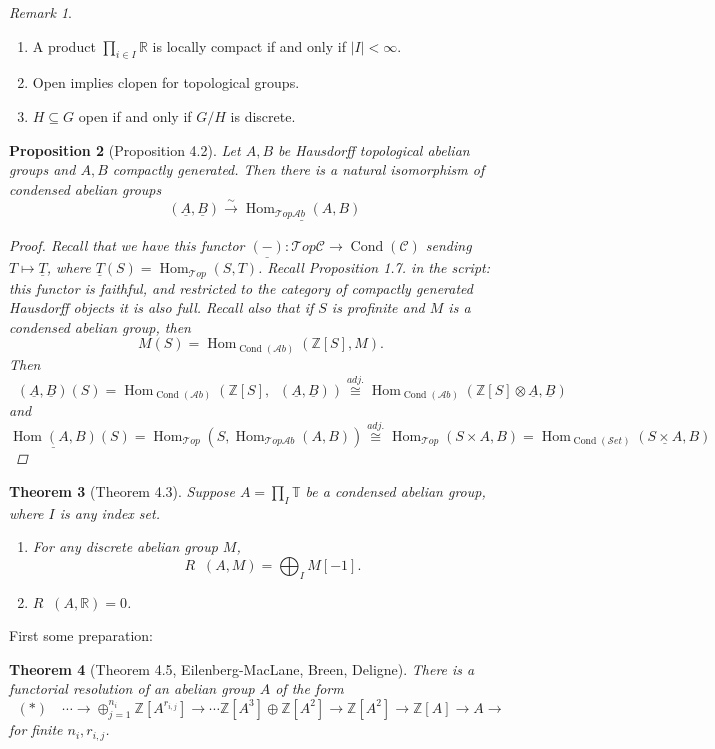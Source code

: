 \documentclass[12pt]{article}
\theoremstyle{darkgreentheorem}
\newtheorem{thm}{Theorem}
\newtheorem{prop}[thm]{Proposition}
\theoremstyle{darkbluedefinition}
\theoremstyle{darkredexample}
\theoremstyle{remark}
\newtheorem{rem}[thm]{Remark}
\newcommand{\Z}{\mathbb{Z}}
\newcommand{\R}{\mathbb{R}}
\newcommand{\1}{\mathbbm{1}}
\newcommand{\bbT}{\mathbb{T}}
\newcommand{\scrC}{\mathscr{C}}
\newcommand{\Top}{\mathscr{T}op}
\newcommand{\Ab}{\mathscr{A}b}
\newcommand{\Set}{\mathscr{S}et}
\DeclareMathOperator{\Hom}{Hom}
\DeclareMathOperator{\Cond}{Cond}
\DeclareMathOperator{\ihom}{\underline{Hom}}
\renewcommand{\u}[1]{\underline{#1}}
\newcommand{\ot}{\otimes}
\newcommand{\op}{\oplus}
\newcommand{\tms}{\times}
\newcommand{\sub}{\subseteq}
\begin{document}
\begin{rem}
    \begin{enumerate}[label=\roman*)]
	\item A product $\prod_{i\in I}\R$ is locally compact if and only if $|I|<\infty$.
	\item Open implies clopen for topological groups.
	\item $H\sub G$ open if and only if $G/H$ is discrete.
    \end{enumerate}
\end{rem}

\begin{prop}[Proposition 4.2]
    Let $A,B$ be Hausdorff topological abelian groups and $A,B$ compactly generated.
    Then there is a natural isomorphism of condensed abelian groups
    \[ \ihom(\u{A},\u{B})\xrightarrow{\sim} \u{\Hom_{\Top\Ab}(A,B)} \]
    \begin{proof}
	Recall that we have this functor $\u{(-)}\colon \Top\scrC\to \Cond(\scrC)$ sending $T\mapsto \u{T}$, where $\u{T}(S)=\Hom_{\Top}(S,T)$.
	Recall Proposition 1.7. in the script: this functor is faithful, and restricted to the category of compactly generated Hausdorff objects it is also full.
	Recall also that if $S$ is profinite and $M$ is a condensed abelian group, then
	\[ M(S)=\Hom_{\Cond(\Ab)}(\Z[S],M). \]
	Then
	\[ \ihom(\u{A},\u{B})(S)=\Hom_{\Cond(\Ab)}(\Z[S],\ihom(\u{A},\u{B}))\overset{adj.}{\cong} \Hom_{\Cond(\Ab)}(\Z[S]\ot \u{A}, \u{B}) \]
	and
	\[ \u{\Hom(A,B)}(S)=\Hom_{\Top}(S,\Hom_{\Top\Ab}(A,B))\overset{adj.}{\cong} \Hom_{\Top}(S\tms A,B)=\Hom_{\Cond(\Set)}(\u{S\tms A},B) \]
    \end{proof}
\end{prop}

\begin{thm}[Theorem 4.3]
    Suppose $A=\prod_{I}\bbT$ be a condensed abelian group, where $I$ is any index set.
    \begin{enumerate}[label=\roman*)]
	\item For any discrete abelian group $M$,
	    \[ R\ihom(A,M)=\bigoplus_{I}M[-1]. \]
	\item $R\ihom(A,\R)=0$.
    \end{enumerate}
\end{thm}

First some preparation:

\begin{thm}[Theorem 4.5, Eilenberg-MacLane, Breen, Deligne]
    There is a functorial resolution of an abelian group $A$ of the form
    \[ (*)\quad \cdots \to \op_{j=1}^{n_{i}}\Z[A^{r_{{i,j}}}]\to \cdots \Z[A^{3}]\op \Z[A^{2}]\to \Z[A^{2}]\to \Z[A]\to A\to \]
    for finite $n_{i},r_{i,j}$.
\end{thm}
\end{document}
